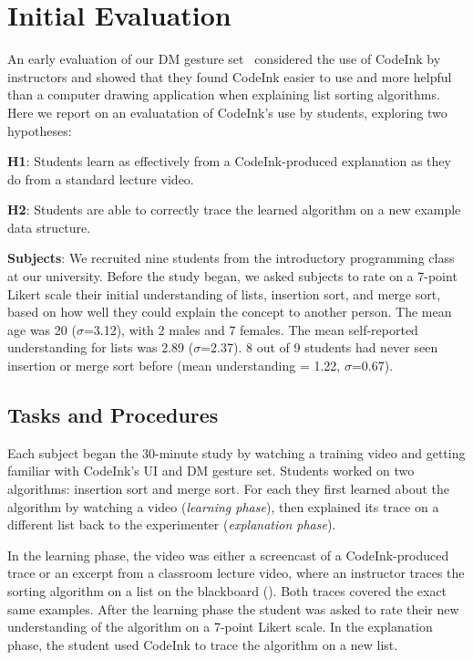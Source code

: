 \section{Initial Evaluation}

An early evaluation of our DM gesture set~\cite{Scott2014} considered the use of CodeInk by instructors and showed
that they found CodeInk easier to use and more helpful than a
computer drawing application when explaining list sorting algorithms. Here we report on an evaluatation of CodeInk's
use by students, exploring two hypotheses:

\noindent \textbf{H1}: Students learn as effectively from a
CodeInk-produced explanation as they do from a standard lecture video.

\noindent \textbf{H2}: Students are able to correctly trace the learned
algorithm on a new example data structure.

\noindent \textbf{Subjects}: We recruited nine students from the
introductory programming class at our university. Before the study
began, we asked subjects to rate on a 7-point Likert scale their initial understanding of lists,
insertion sort, and merge sort, based on how
well they could explain the concept to another person. The mean age was
20 ($\sigma$=3.12), with 2 males and 7 females. The mean self-reported
understanding for lists was 2.89 ($\sigma$=2.37). 8 out of 9 students
had never seen insertion or merge sort before (mean understanding =
1.22, $\sigma$=0.67).

\subsection{Tasks and Procedures}
Each subject began the 30-minute study by watching a training video and getting
familiar with CodeInk's UI and DM gesture set. Students worked on two
algorithms: insertion sort and merge sort. For each they first learned about the
algorithm by watching a video ({\em learning phase}), then explained its trace
on a different list back to the experimenter ({\em explanation phase}).

In the learning phase, the video was either a screencast of a
CodeInk-produced trace or an excerpt from a classroom lecture
video, where an instructor traces the sorting algorithm on a 
list on the blackboard (). Both 
traces covered the exact same examples. After the learning 
phase the student was asked to rate their new understanding of the
algorithm on a 7-point Likert scale. In the explanation phase, the
student used CodeInk to trace the algorithm on a new list.

